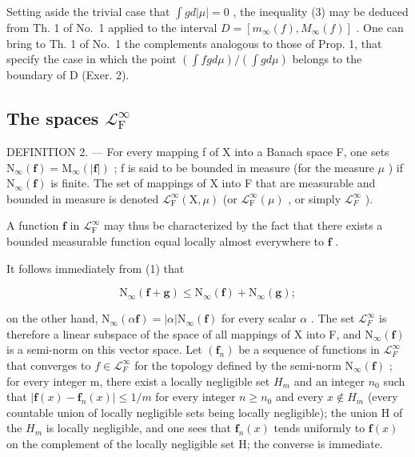 Setting aside the trivial case that \(\int g d|\mu| = 0\) , the inequality (3) may be deduced from Th. 1 of No.~1 applied to the interval \(D = [m_{\infty}(f), M_{\infty}(f)]\) . One can bring to Th. 1 of No.~1 the complements analogous to those of Prop. 1, that specify the case in which the point \((\int f g d\mu)/(\int g d\mu)\) belongs to the boundary of D (Exer. 2).

\subsection{\texorpdfstring{The spaces \(\mathcal{L}_{\mathrm{F}}^{\infty}\)}{The spaces L sub F to infinity}}

DEFINITION 2. --- For every mapping f of X into a Banach space F, one sets \(\mathrm{N}_{\infty}(\mathbf{f}) = \mathrm{M}_{\infty}(|\mathbf{f}|)\) ; f is said to be bounded in measure (for the measure \(\mu\) ) if \(\mathrm{N}_{\infty}(\mathbf{f})\) is finite. The set of mappings of X into F that are measurable and bounded in measure is denoted \(\mathcal{L}_{\mathrm{F}}^{\infty}(\mathrm{X}, \mu)\) (or \(\mathcal{L}_{\mathrm{F}}^{\infty}(\mu)\) , or simply \(\mathcal{L}_{F}^{\infty}\) ).

A function \(\mathbf{f}\) in \(\mathcal{L}_{\mathrm{F}}^{\infty}\) may thus be characterized by the fact that there exists a bounded measurable function equal locally almost everywhere to \(\mathbf{f}\) .

It follows immediately from (1) that

\[
\mathrm{N} _ {\infty} (\mathbf {f} + \mathbf {g}) \leqslant \mathrm{N} _ {\infty} (\mathbf {f}) + \mathrm{N} _ {\infty} (\mathbf {g});
\]

on the other hand, \(\mathrm{N}_{\infty}(\alpha\mathbf{f}) = |\alpha| \mathrm{N}_{\infty}(\mathbf{f})\) for every scalar \(\alpha\) . The set \(\mathcal{L}_{F}^{\infty}\) is therefore a linear subspace of the space of all mappings of X into F, and \(\mathrm{N}_{\infty}(\mathbf{f})\) is a semi-norm on this vector space. Let \((\mathbf{f}_{n})\) be a sequence of functions in \(\mathcal{L}_{F}^{\infty}\) that converges to \(f \in \mathcal{L}_{F}^{\infty}\) for the topology defined by the semi-norm \(\mathrm{N}_{\infty}(\mathbf{f})\) ; for every integer m, there exist a locally negligible set \(H_{m}\) and an integer \(n_{0}\) such that \(|\mathbf{f}(x) - \mathbf{f}_{n}(x)| \leqslant 1/m\) for every integer \(n \geqslant n_{0}\) and every \(x \notin H_{m}\) (every countable union of locally negligible sets being locally negligible); the union H of the \(H_{m}\) is locally negligible, and one sees that \(\mathbf{f}_{n}(x)\) tends uniformly to \(\mathbf{f}(x)\) on the complement of the locally negligible set H; the converse is immediate.

